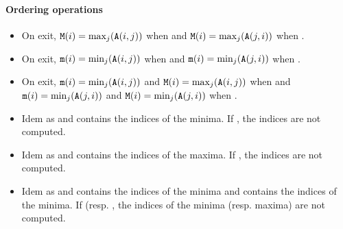 \paragraph{Ordering operations}

\begin{itemize}
\item {}
  \sshortdescribe On exit, ${\tt M}(i) = \max_{j}({\tt A}(i, j))$ when 
  and ${\tt M}(i) = \max_{j}({\tt A}(j, i))$ when .

\item {}
  \sshortdescribe On exit, ${\tt m}(i) = \min_{j}({\tt A}(i, j))$ when 
  and ${\tt m}(i) = \min_{j}({\tt A}(j, i))$ when .

\item {}
  \sshortdescribe On exit, ${\tt m}(i) = \min_{j}({\tt A}(i, j))$ and ${\tt M}(i) =
  \max_{j}({\tt A}(i, j))$ when  and ${\tt m}(i) = \min_{j}({\tt A}(j, i))$
  and ${\tt M}(i) = \min_{j}({\tt A}(j, i))$ when .
  
\item {}
  \sshortdescribe Idem as  and  contains the
  indices of the minima. If , the indices are not computed.

\item {}
  \sshortdescribe Idem as  and  contains the
  indices of the maxima. If , the indices are not computed.

\item {}
  \sshortdescribe Idem as  and  contains the
  indices of the minima and  contains the indices of the minima. If
   (resp. , the indices of the minima
  (resp. maxima) are not computed.


\end{itemize}
